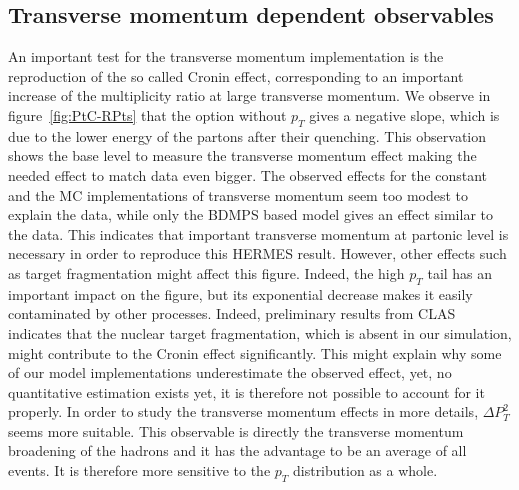 \subsection{Transverse momentum dependent observables}

An important test for the transverse momentum implementation is the 
reproduction of the so called Cronin effect, corresponding to an important 
increase of the multiplicity ratio at large transverse momentum. We observe in 
figure~\ref{fig:PtC-RPts} that the option without $p_T$ gives a negative slope, 
which is due to the lower energy of the partons after their quenching. This 
observation shows the base level to measure the transverse momentum effect 
making the needed effect to match data even bigger. The observed effects for 
the constant and the MC implementations of transverse momentum seem too modest 
to explain the data, while only the BDMPS based model gives an effect similar 
to the data. This indicates that important transverse momentum at partonic 
level is necessary in order to reproduce this HERMES result. However, other 
effects such as target fragmentation might affect this figure. Indeed, the high 
$p_T$ tail has an important impact on the figure, but its exponential decrease 
makes it easily contaminated by other processes. Indeed, preliminary results 
from CLAS \cite{dupre-th} indicates that the nuclear target fragmentation, 
which is absent in our simulation, might contribute to the Cronin effect 
significantly. This might explain why some of our model implementations 
underestimate the observed effect, yet, no quantitative estimation exists yet, 
it is therefore not possible to account for it properly. In order to study the 
transverse momentum effects in more details, $\Delta P_T^2$ seems more 
suitable. This observable is directly the transverse momentum broadening of the 
hadrons and it has the advantage to be an average of all events. It is 
therefore more sensitive to the $p_T$ distribution as a whole.

